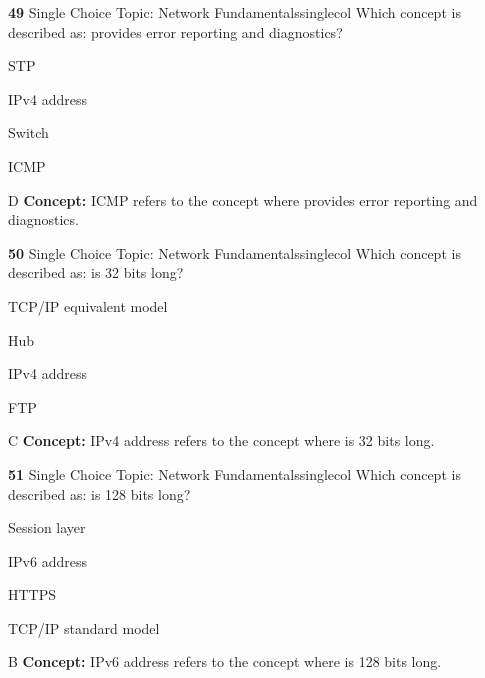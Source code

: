 \documentclass[10pt,a4paper]{article}
\begin{document}
\begin{qcard}{\color{white}\textbf{49} \hfill \small Single Choice \textbar{} Topic: Network Fundamentals}{singlecol}
Which concept is described as: provides error reporting and diagnostics?

\begin{qoptions}
\item STP
\item IPv4 address
\item Switch
\item ICMP
\end{qoptions}
\begin{explainbox}{D}
\textbf{Concept:} ICMP refers to the concept where provides error reporting and diagnostics.
\end{explainbox}
\end{qcard}

\begin{qcard}{\color{white}\textbf{50} \hfill \small Single Choice \textbar{} Topic: Network Fundamentals}{singlecol}
Which concept is described as: is 32 bits long?

\begin{qoptions}
\item TCP/IP equivalent model
\item Hub
\item IPv4 address
\item FTP
\end{qoptions}
\begin{explainbox}{C}
\textbf{Concept:} IPv4 address refers to the concept where is 32 bits long.
\end{explainbox}
\end{qcard}

\begin{qcard}{\color{white}\textbf{51} \hfill \small Single Choice \textbar{} Topic: Network Fundamentals}{singlecol}
Which concept is described as: is 128 bits long?

\begin{qoptions}
\item Session layer
\item IPv6 address
\item HTTPS
\item TCP/IP standard model
\end{qoptions}
\begin{explainbox}{B}
\textbf{Concept:} IPv6 address refers to the concept where is 128 bits long.
\end{explainbox}
\end{qcard}
\end{document}

